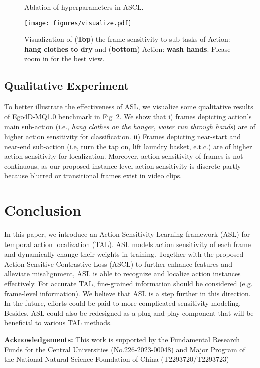 \documentclass[10pt,twocolumn,letterpaper]{article}
\begin{document}
\begin{figure}[t]
\centering
{}
\caption{Ablation of hyperparameters in ASCL.}
\label{fig:abl_lambda}
\end{figure}



\begin{figure}[t]
\centering
\texttt{[image: figures/visualize.pdf]}
\caption{Visualization of (\textbf{Top}) the frame sensitivity to sub-tasks of Action: \textbf{hang clothes to dry} and (\textbf{bottom}) Action: \textbf{wash hands}. Please zoom in for the best view.}
\label{fig:visualize}
\end{figure}

\subsection{Qualitative Experiment}
To better illustrate the effectiveness of ASL, we visualize some qualitative results of Ego4D-MQ1.0 benchmark in Fig~\ref{fig:visualize}. We show that i) frames depicting action's main sub-action (i.e., \textit{hang clothes on the hanger}, \textit{water run through hands}) are of higher action sensitivity for classification. ii) Frames depicting near-start and near-end sub-action (i.e, turn the tap on, lift laundry basket, e.t.c.) are of higher action sensitivity for localization. Moreover, action sensitivity of frames is not continuous, as our proposed instance-level action sensitivity is discrete partly because blurred or transitional frames exist in video clips.

\vspace{2.3em}
\section{Conclusion}
In this paper, we introduce an Action Sensitivity Learning framework (ASL) for temporal action localization (TAL). ASL models action sensitivity of each frame and dynamically change their weights in training. Together with the proposed Action Sensitive Contrastive Loss (ASCL) to further enhance features and alleviate misalignment,  ASL is able to recognize and localize action instances effectively.  For accurate TAL, fine-grained information should be considered (e.g. frame-level information). We believe that ASL is a step further in this direction. In the future, efforts could be paid to more complicated sensitivity modeling. Besides, ASL could also be redesigned as a plug-and-play component that will be beneficial to various TAL methods.

\textbf{Acknowledgements:} This work is supported by the Fundamental Research
Funds for the Central Universities (No.226-2023-00048) and Major Program of the National Natural Science Foundation of China (T2293720/T2293723)

\clearpage
{\small


}
\end{document}

